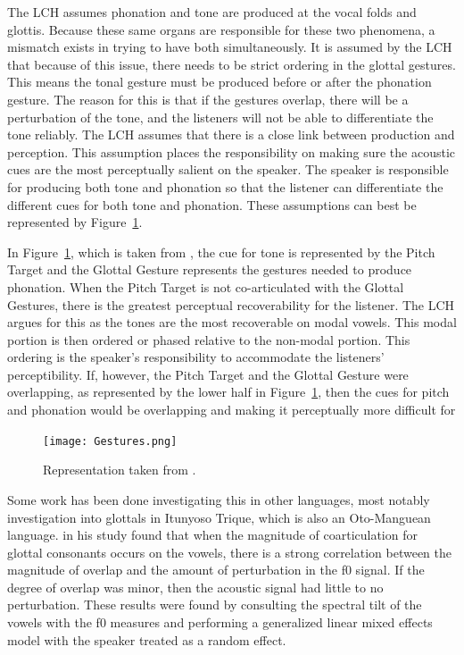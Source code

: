\documentclass[12pt, letterpaper]{article}
\begin{document}
The LCH assumes phonation and tone are produced at the vocal folds and glottis. Because these same organs are responsible for these two phenomena, a mismatch exists in trying to have both simultaneously. It is assumed by the LCH that because of this issue, there needs to be strict ordering in the glottal gestures. This means the tonal gesture must be produced before or after the phonation gesture. The reason for this is that if the gestures overlap, there will be a perturbation of the tone, and the listeners will not be able to differentiate the tone reliably. The LCH assumes that there is a close link between production and perception. This assumption places the responsibility on making sure the acoustic cues are the most perceptually salient on the speaker. The speaker is responsible for producing both tone and phonation so that the listener can differentiate the different cues for both tone and phonation. These assumptions can best be represented by Figure~\ref{fig:GlottalGestures}. 

In Figure~\ref{fig:GlottalGestures}, which is taken from \citet{dicanioCoarticulationToneGlottal2012}, the cue for tone is represented by the Pitch Target and the Glottal Gesture represents the gestures needed to produce phonation. When the Pitch Target is not co-articulated with the Glottal Gestures, there is the greatest perceptual recoverability for the listener. The LCH argues for this as the tones are the most recoverable on modal vowels. This modal portion is then ordered or phased relative to the non-modal portion. This ordering is the speaker's responsibility to accommodate the listeners' perceptibility. If, however, the Pitch Target and the Glottal Gesture were overlapping, as represented by the lower half in Figure~\ref{fig:GlottalGestures}, then the cues for pitch and phonation would be overlapping and making it perceptually more difficult for 
\begin{figure}[!ht]
	\centering
	\texttt{[image: Gestures.png]}
	\caption{Representation taken from \citet{dicanioCoarticulationToneGlottal2012}.}
	\label{fig:GlottalGestures}
\end{figure}

Some work has been done investigating this in other languages, most notably  investigation into glottals in Itunyoso Trique, which is also an Oto-Manguean language. \citeauthor{dicanioCoarticulationToneGlottal2012} in his study found that when the magnitude of coarticulation for glottal consonants occurs on the vowels, there is a strong correlation between the magnitude of overlap and the amount of perturbation in the f0 signal. If the degree of overlap was minor, then the acoustic signal had little to no perturbation. These results were found by consulting the spectral tilt of the vowels with the f0 measures and performing a generalized linear mixed effects model with the speaker treated as a random effect. 
\end{document}

